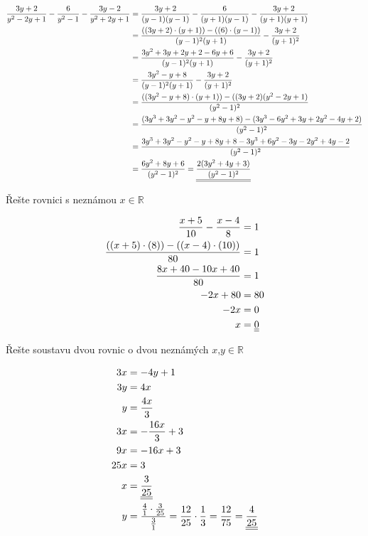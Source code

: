 \begin{align*}
    \frac{3y+2}{y^2-2y+1} - \frac{6}{y^2-1} - \frac{3y-2}{y^2+2y+1} 
     &= \frac{3y+2}{(y-1)(y-1)} - \frac{6}{(y+1)(y-1)} - \frac{3y+2}{(y+1)(y+1)} 
    \\ &= \frac{((3y+2)\cdot(y+1))-((6)\cdot(y-1))}{(y-1)^2(y+1)} - \frac{3y+2}{(y+1)^2}
    \\ &= \frac{3y^2+3y+2y+2-6y+6}{(y-1)^2(y+1)} - \frac{3y+2}{(y+1)^2}
    \\ &= \frac{3y^2-y+8}{(y-1)^2(y+1)} - \frac{3y+2}{(y+1)^2}
    \\ &= \frac{((3y^2-y+8)\cdot(y+1))-((3y+2)(y^2-2y+1)}{(y^2-1)^2}
    \\ &= \frac{(3y^3+3y^2-y^2-y+8y+8)-(3y^3-6y^2+3y+2y^2-4y+2)}{(y^2-1)^2}
    \\ &= \frac{3y^3+3y^2-y^2-y+8y+8-3y^3+6y^2-3y-2y^2+4y-2}{(y^2-1)^2}
    \\ &= \frac{6y^2+8y+6}{(y^2-1)^2}
    = \underline{\underline{\frac{2(3y^2+4y+3)}{(y^2-1)^2}}}
\end{align*}
\begin{example}
    Řešte rovnici s neznámou $x \in \mathbb{R} $ 
\end{example}
\begin{align*}
    \frac{x+5}{10} - \frac{x-4}{8} &= 1
    \\ \frac{((x+5)\cdot(8)) - ((x-4)\cdot(10))}{80} &= 1
    \\ \frac{8x+40-10x+40}{80} &= 1
    \\ -2x + 80 &= 80
    \\ -2x &= 0
    \\ x &= \underline{\underline{0}}
\end{align*}
\begin{example}
    Řešte soustavu dvou rovnic o dvou neznámých $x$,$y \in \mathbb{R}$
\end{example}
\begin{align*}
    3x &= -4y+1
    \\ 3y &= 4x
    \\ y &= \frac{4x}{3}
    \\ 3x &= -\frac{16x}{3} + 3
    \\ 9x &= -16x +3
    \\ 25x &= 3
    \\  x &= \underline{\underline{\frac{3}{25}}}
    \\ y &= \frac{\frac{4}{1}\cdot \frac{3}{25}}{\frac{3}{1}} = \frac{12}{25} \cdot \frac{1}{3} = \frac{12}{75} = \underline{\underline{\frac{4}{25}}}
\end{align*}
